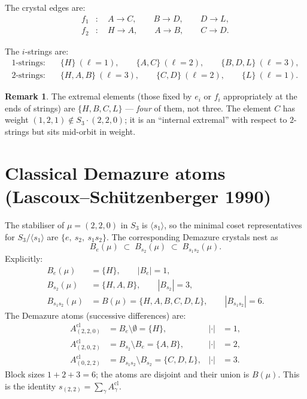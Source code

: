 \documentclass[11pt]{article}
\theoremstyle{definition}
\newtheorem{remark}[theorem]{Remark}
\begin{document}
The crystal edges are:
\begin{align*}
f_1&:\quad A \to C,\qquad B \to D,\qquad D \to L,\\
f_2&:\quad H \to A,\qquad A \to B,\qquad C \to D.
\end{align*}

The $i$-strings are:
\begin{align*}
1\text{-strings:}&\quad \{H\}\ (\ell=1),\qquad \{A,C\}\ (\ell=2),\qquad \{B,D,L\}\ (\ell=3),\\
2\text{-strings:}&\quad \{H,A,B\}\ (\ell=3),\qquad \{C,D\}\ (\ell=2),\qquad \{L\}\ (\ell=1).
\end{align*}

\begin{remark}
The extremal elements (those fixed by $e_i$ or $f_i$ appropriately at the ends of strings) are $\{H, B, C, L\}$ --- \emph{four} of them, not three. The element $C$ has weight $(1,2,1) \notin S_3\cdot(2,2,0)$; it is an ``internal extremal'' with respect to $2$-strings but sits mid-orbit in weight.
\end{remark}

\section{Classical Demazure atoms (Lascoux--Sch\"{u}tzenberger 1990)}

The stabiliser of $\mu=(2,2,0)$ in $S_3$ is $\langle s_1 \rangle$, so the minimal coset representatives for $S_3/\langle s_1\rangle$ are $\{e,\ s_2,\ s_1 s_2\}$. The corresponding Demazure crystals nest as
\[
B_e(\mu) \;\subset\; B_{s_2}(\mu) \;\subset\; B_{s_1 s_2}(\mu).
\]
Explicitly:
\begin{align*}
B_e(\mu) &= \{H\},\qquad |B_e| = 1,\\
B_{s_2}(\mu) &= \{H, A, B\},\qquad |B_{s_2}| = 3,\\
B_{s_1 s_2}(\mu) &= B(\mu) = \{H,A,B,C,D,L\},\qquad |B_{s_1 s_2}| = 6.
\end{align*}
The Demazure atoms (successive differences) are:
\begin{align*}
A^{\mathrm{cl}}_{(2,2,0)} &= B_e \setminus \emptyset = \{H\}, & |\cdot| &= 1,\\
A^{\mathrm{cl}}_{(2,0,2)} &= B_{s_2} \setminus B_e = \{A, B\}, & |\cdot| &= 2,\\
A^{\mathrm{cl}}_{(0,2,2)} &= B_{s_1 s_2} \setminus B_{s_2} = \{C, D, L\}, & |\cdot| &= 3.
\end{align*}
Block sizes $1+2+3 = 6$; the atoms are disjoint and their union is $B(\mu)$. This is the identity $s_{(2,2)} = \sum_\gamma A^{\mathrm{cl}}_\gamma$.
\end{document}
